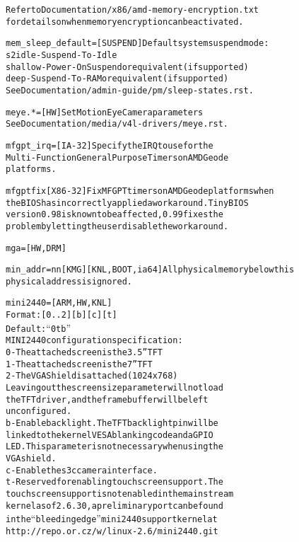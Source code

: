 \documentclass[a4paper,8pt,english]{sphinxmanual}
\begin{document}
\begin{alltt}
                        Refer to Documentation/x86/amd-memory-encryption.txt
                        for details on when memory encryption can be activated.

        mem\_sleep\_default=      {[}SUSPEND{]} Default system suspend mode:
                        s2idle  - Suspend-To-Idle
                        shallow - Power-On Suspend or equivalent (if supported)
                        deep    - Suspend-To-RAM or equivalent (if supported)
                        See Documentation/admin-guide/pm/sleep-states.rst.

        meye.*=         {[}HW{]} Set MotionEye Camera parameters
                        See Documentation/media/v4l-drivers/meye.rst.

        mfgpt\_irq=      {[}IA-32{]} Specify the IRQ to use for the
                        Multi-Function General Purpose Timers on AMD Geode
                        platforms.

        mfgptfix        {[}X86-32{]} Fix MFGPT timers on AMD Geode platforms when
                        the BIOS has incorrectly applied a workaround. TinyBIOS
                        version 0.98 is known to be affected, 0.99 fixes the
                        problem by letting the user disable the workaround.

        mga=            {[}HW,DRM{]}

        min\_addr=nn{[}KMG{]}        {[}KNL,BOOT,ia64{]} All physical memory below this
                        physical address is ignored.

        mini2440=       {[}ARM,HW,KNL{]}
                        Format:{[}0..2{]}{[}b{]}{[}c{]}{[}t{]}
                        Default: ``0tb''
                        MINI2440 configuration specification:
                        0 - The attached screen is the 3.5'' TFT
                        1 - The attached screen is the 7'' TFT
                        2 - The VGA Shield is attached (1024x768)
                        Leaving out the screen size parameter will not load
                        the TFT driver, and the framebuffer will be left
                        unconfigured.
                        b - Enable backlight. The TFT backlight pin will be
                        linked to the kernel VESA blanking code and a GPIO
                        LED. This parameter is not necessary when using the
                        VGA shield.
                        c - Enable the s3c camera interface.
                        t - Reserved for enabling touchscreen support. The
                        touchscreen support is not enabled in the mainstream
                        kernel as of 2.6.30, a preliminary port can be found
                        in the ``bleeding edge'' mini2440 support kernel at
                        http://repo.or.cz/w/linux-2.6/mini2440.git


\end{alltt}
\end{document}
